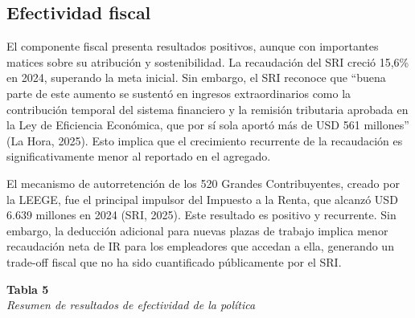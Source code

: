 \documentclass[12pt,spanish]{article}
\begin{document}
\subsection{Efectividad fiscal}\label{efectividad-fiscal}

El componente fiscal presenta resultados positivos, aunque con
importantes matices sobre su atribución y sostenibilidad. La recaudación
del SRI creció 15,6\% en 2024, superando la meta inicial. Sin embargo,
el SRI reconoce que ``buena parte de este aumento se sustentó en
ingresos extraordinarios como la contribución temporal del sistema
financiero y la remisión tributaria aprobada en la Ley de Eficiencia
Económica, que por sí sola aportó más de USD 561 millones'' (La Hora,
2025). Esto implica que el crecimiento recurrente de la recaudación es
significativamente menor al reportado en el agregado.

El mecanismo de autorretención de los 520 Grandes Contribuyentes, creado
por la LEEGE, fue el principal impulsor del Impuesto a la Renta, que
alcanzó USD 6.639 millones en 2024 (SRI, 2025). Este resultado es
positivo y recurrente. Sin embargo, la deducción adicional para nuevas
plazas de trabajo implica menor recaudación neta de IR para los
empleadores que accedan a ella, generando un trade-off fiscal que no ha
sido cuantificado públicamente por el SRI.

\textbf{Tabla 5}\\
\emph{Resumen de resultados de efectividad de la política}
\end{document}

